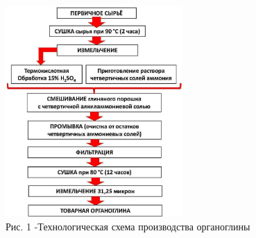 \begin{figure}[H]
	\centering
	\includegraphics[width=0.6\textwidth]{assets/1014}
	\caption*{Рис. 1 -Технологическая схема производства органоглины}
\end{figure}

